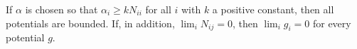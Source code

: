 If $\alpha$ is chosen so that $\alpha_i \geq k N_{ii}$ for all $i$ with $k$ a positive constant, then all potentials are bounded. If, in addition, $\lim_i N_{ij} = 0$, then $\lim_i g_i = 0$ for every potential $g$.
